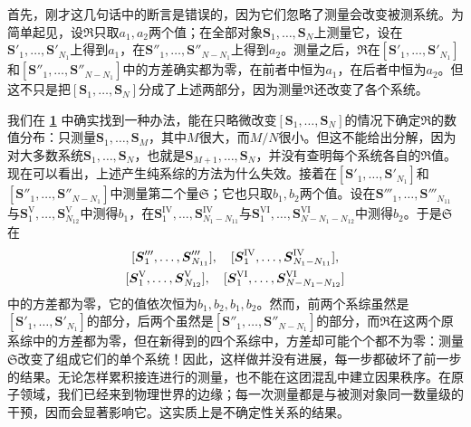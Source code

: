 \documentclass[fontsize=13pt,twoside,openany,headings=normal,parskip=false,bookmarkpackage=false,DIV=calc]{scrbook}
\begin{document}
首先，刚才这几句话中的断言是错误的，因为它们忽略了测量会改变被测系统。为简单起见，设$\mathfrak R$只取$a_1,\allowbreak a_2$两个值；在全部对象$\boldsymbol{S}_1,\allowbreak \ldots,\allowbreak \boldsymbol{S}_N$上测量它，设在$\boldsymbol{S}'_1,\allowbreak \ldots,\allowbreak \boldsymbol{S}'_{N_1}$上得到$a_1$，在$\boldsymbol{S}''_1,\allowbreak \ldots,\allowbreak \boldsymbol{S}''_{N-N_1}$上得到$a_2$。测量之后，$\mathfrak R$在$[\boldsymbol{S}'_1,\allowbreak \ldots,\allowbreak \boldsymbol{S}'_{N_1}]$和$[\boldsymbol{S}''_1,\allowbreak \ldots,\allowbreak \boldsymbol{S}''_{N-N_1}]$中的方差确实都为零，在前者中恒为$a_1$，在后者中恒为$a_2$。但这不只是把$[\boldsymbol{S}_1,\allowbreak \ldots,\allowbreak \boldsymbol{S}_N]$分成了上述两部分，因为测量$\mathfrak R$还改变了各个系统。

我们在 \hyperref[advantage:IV.1.1]{\textbf{1}} 中确实找到一种办法，能在只略微改变$[\boldsymbol{S}_1,\allowbreak \ldots,\allowbreak \boldsymbol{S}_N]$的情况下确定$\mathfrak R$的数值分布：只测量$\boldsymbol{S}_1,\allowbreak \ldots,\allowbreak \boldsymbol{S}_M$，其中$M$很大，而$M/N$很小。但这不能给出分解，因为对大多数系统$\boldsymbol{S}_1,\allowbreak \ldots,\allowbreak \boldsymbol{S}_N$，也就是$\boldsymbol{S}_{M+1},\allowbreak \ldots,\allowbreak \boldsymbol{S}_N$，并没有查明每个系统各自的$\mathfrak R$值。现在可以看出，上述产生纯系综的方法为什么失效。接着在$[\boldsymbol{S}'_1,\allowbreak \ldots,\allowbreak \boldsymbol{S}'_{N_1}]$和$[\boldsymbol{S}''_1,\allowbreak \ldots,\allowbreak \boldsymbol{S}''_{N-N_1}]$中测量第二个量$\mathfrak S$；它也只取$b_1,\allowbreak b_2$两个值。设在$\boldsymbol{S}'''_1,\allowbreak \ldots,\allowbreak \boldsymbol{S}'''_{N_{11}}$与$\boldsymbol{S}^{\mathrm V}_1,\allowbreak \ldots,\allowbreak \boldsymbol{S}^{\mathrm V}_{N_{12}}$中测得$b_1$，在$\boldsymbol{S}^{\mathrm{IV}}_1,\allowbreak \ldots,\allowbreak \boldsymbol{S}^{\mathrm{IV}}_{N_1-N_{11}}$与$\boldsymbol{S}^{\mathrm{VI}}_1,\allowbreak \ldots,\allowbreak \boldsymbol{S}^{\mathrm{VI}}_{N-N_1-N_{12}}$中测得$b_2$。于是$\mathfrak S$在
\begin{gather*}\relax
[\boldsymbol{S}'''_1,\ldots,\boldsymbol{S}'''_{N_{11}}],\quad
[\boldsymbol{S}^{\mathrm{IV}}_1,\ldots,\boldsymbol{S}^{\mathrm{IV}}_{N_1-N_{11}}],\\
[\boldsymbol{S}^{\mathrm V}_1,\ldots,\boldsymbol{S}^{\mathrm V}_{N_{12}}],\quad
[\boldsymbol{S}^{\mathrm{VI}}_1,\ldots,\boldsymbol{S}^{\mathrm{VI}}_{N-N_1-N_{12}}]
\end{gather*}
中的方差都为零，它的值依次恒为$b_1,\allowbreak b_2,\allowbreak b_1,\allowbreak b_2$。然而，前两个系综虽然是$[\boldsymbol{S}'_1,\allowbreak \ldots,\allowbreak \boldsymbol{S}'_{N_1}]$的部分，后两个虽然是$[\boldsymbol{S}''_1,\allowbreak \ldots,\allowbreak \boldsymbol{S}''_{N-N_1}]$的部分，而$\mathfrak R$在这两个原系综中的方差都为零，但在新得到的四个系综中，方差却可能个个都不为零：测量$\mathfrak S$改变了组成它们的单个系统！因此，这样做并没有进展，每一步都破坏了前一步的结果。无论怎样累积接连进行的\hypertarget{origpage-162}{}\label{origpage-162}测量，也不能在这团混乱中建立因果秩序。在原子领域，我们已经来到物理世界的边缘；每一次测量都是与被测对象同一数量级的干预，因而会显著影响它。这实质上是不确定性关系的结果。
\end{document}
